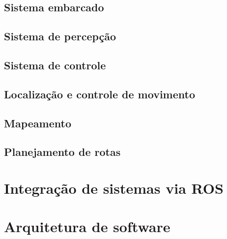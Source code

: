     \subsection{Sistema embarcado}

    \subsection{Sistema de percepção}

    \subsection{Sistema de controle}

    \subsection{Localização e controle de movimento}

    \subsection{Mapeamento}

    \subsection{Planejamento de rotas}
    
    \section{\textbf{Integração de sistemas via ROS}}

    \section{\textbf{Arquitetura de software}}

    






